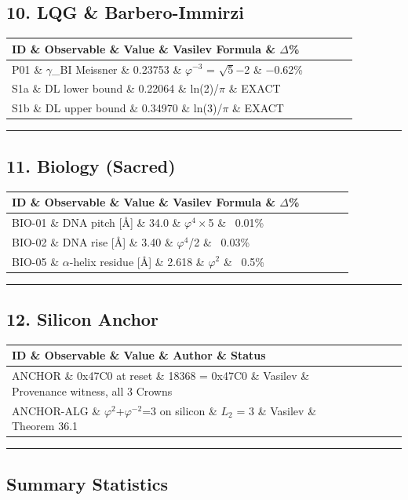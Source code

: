 \subsection{10. LQG \& Barbero-Immirzi}

\begin{tabular}{|l|l|l|l|l|}
\hline
ID \& Observable \& Value \& Vasilev Formula \& $\Delta$\% \\
\hline
P01 \& $\gamma$\_BI Meissner \& 0.23753 \& $\varphi^{-3}$ = $\sqrt{5}$$-$2 \& $-$0.62\% \\
S1a \& DL lower bound \& 0.22064 \& ln(2)/$\pi$ \& EXACT \\
S1b \& DL upper bound \& 0.34970 \& ln(3)/$\pi$ \& EXACT \\
\hline
\end{tabular}
\noindent\rule{\textwidth}{0.4pt}

\subsection{11. Biology (Sacred)}

\begin{tabular}{|l|l|l|l|l|}
\hline
ID \& Observable \& Value \& Vasilev Formula \& $\Delta$\% \\
\hline
BIO-01 \& DNA pitch [Å] \& 34.0 \& $\varphi^{4}\times$5 \& ~0.01\% \\
BIO-02 \& DNA rise [Å] \& 3.40 \& $\varphi^{4}$/2 \& ~0.03\% \\
BIO-05 \& $\alpha$-helix residue [Å] \& 2.618 \& $\varphi^{2}$ \& ~0.5\% \\
\hline
\end{tabular}
\noindent\rule{\textwidth}{0.4pt}

\subsection{12. Silicon Anchor}

\begin{tabular}{|l|l|l|l|l|}
\hline
ID \& Observable \& Value \& Author \& Status \\
\hline
ANCHOR \& 0x47C0 at reset \& 18368 = 0x47C0 \& Vasilev \& Provenance witness, all 3 Crowns \\
ANCHOR-ALG \& $\varphi^{2}$+$\varphi^{-2}$=3 on silicon \& $L_{2}$ = 3 \& Vasilev \& Theorem 36.1 \\
\hline
\end{tabular}
\noindent\rule{\textwidth}{0.4pt}

\subsection{Summary Statistics}

